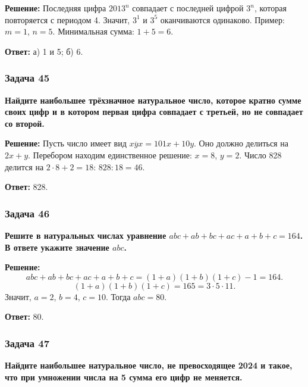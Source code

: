 \documentclass[12pt, a4paper]{article}
\begin{document}
\textbf{Решение:}
Последняя цифра $2013^n$ совпадает с последней цифрой $3^n$, которая повторяется с периодом 4. Значит, $3^1$ и $3^5$ оканчиваются одинаково. Пример: $m=1$, $n=5$. Минимальная сумма: $1+5=6$.

\textbf{Ответ:} а) 1 и 5; б) 6.

\subsubsection*{Задача 45}
\textbf{Найдите наибольшее трёхзначное натуральное число, которое кратно сумме своих цифр и в котором первая цифра совпадает с третьей, но не совпадает со второй.}

\textbf{Решение:}
Пусть число имеет вид $\overline{xyx} = 101x + 10y$. Оно должно делиться на $2x+y$. Перебором находим единственное решение: $x=8$, $y=2$. Число 828 делится на $2 \cdot 8 + 2 = 18$: $828 : 18 = 46$.

\textbf{Ответ:} 828.

\subsubsection*{Задача 46}
\textbf{Решите в натуральных числах уравнение $abc + ab + bc + ac + a + b + c = 164$. В ответе укажите значение $abc$.}

\textbf{Решение:}
\[
abc + ab + bc + ac + a + b + c = (1+a)(1+b)(1+c) - 1 = 164.
\]
\[
(1+a)(1+b)(1+c) = 165 = 3 \cdot 5 \cdot 11.
\]
Значит, $a=2$, $b=4$, $c=10$. Тогда $abc = 80$.

\textbf{Ответ:} 80.

\subsubsection*{Задача 47}
\textbf{Найдите наибольшее натуральное число, не превосходящее 2024 и такое, что при умножении числа на 5 сумма его цифр не меняется.}
\end{document}
